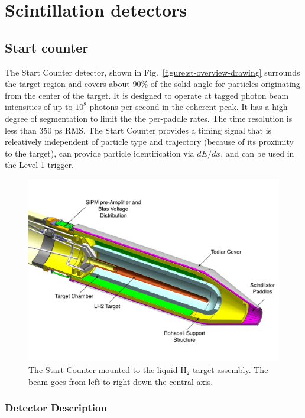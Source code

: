 \section[Scintillation detectors (Mark I./Beni)]{Scintillation detectors \label{sec:scintillators}}
\subsection{Start counter \label{sec:st}}

The Start Counter detector, shown in Fig.~\ref{figure:st-overview-drawing}
surrounds the target
region and covers about 90\% of the solid angle for particles
originating from the center of the target. It is designed to operate
at tagged photon beam intensities of up to $10^8$ photons per second
in the coherent peak. It has a high degree of segmentation to limit
the the per-paddle rates. The time resolution is less than 350 ps
RMS. The Start Counter provides a timing signal that is releatively
independent of particle type and trajectory (because of its proximity
to the target), can provide particle identification via $dE/dx$, and
can be used in the Level 1 trigger.

\begin{figure}[!htb]
\centering
\includegraphics[width=1.0\columnwidth]{figures/start_counter/start_counter_all.pdf}
\caption{The \gx{} Start Counter mounted to the liquid $\mathrm{H_2}$
  target assembly.  The beam goes from left to right down the central
  axis.}\label{fig:st-overview-drawing}
\end{figure}

\subsubsection{Detector Description}

